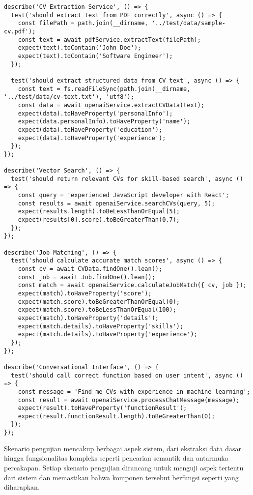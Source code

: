 \begin{verbatim}
describe('CV Extraction Service', () => {
  test('should extract text from PDF correctly', async () => {
    const filePath = path.join(__dirname, '../test/data/sample-cv.pdf');
    const text = await pdfService.extractText(filePath);
    expect(text).toContain('John Doe');
    expect(text).toContain('Software Engineer');
  });

  test('should extract structured data from CV text', async () => {
    const text = fs.readFileSync(path.join(__dirname, '../test/data/cv-text.txt'), 'utf8');
    const data = await openaiService.extractCVData(text);
    expect(data).toHaveProperty('personalInfo');
    expect(data.personalInfo).toHaveProperty('name');
    expect(data).toHaveProperty('education');
    expect(data).toHaveProperty('experience');
  });
});

describe('Vector Search', () => {
  test('should return relevant CVs for skill-based search', async () => {
    const query = 'experienced JavaScript developer with React';
    const results = await openaiService.searchCVs(query, 5);
    expect(results.length).toBeLessThanOrEqual(5);
    expect(results[0].score).toBeGreaterThan(0.7);
  });
});

describe('Job Matching', () => {
  test('should calculate accurate match scores', async () => {
    const cv = await CVData.findOne().lean();
    const job = await Job.findOne().lean();
    const match = await openaiService.calculateJobMatch({ cv, job });
    expect(match).toHaveProperty('score');
    expect(match.score).toBeGreaterThanOrEqual(0);
    expect(match.score).toBeLessThanOrEqual(100);
    expect(match).toHaveProperty('details');
    expect(match.details).toHaveProperty('skills');
    expect(match.details).toHaveProperty('experience');
  });
});

describe('Conversational Interface', () => {
  test('should call correct function based on user intent', async () => {
    const message = 'Find me CVs with experience in machine learning';
    const result = await openaiService.processChatMessage(message);
    expect(result).toHaveProperty('functionResult');
    expect(result.functionResult.length).toBeGreaterThan(0);
  });
});
\end{verbatim}

Skenario pengujian mencakup berbagai aspek sistem, dari ekstraksi data dasar hingga fungsionalitas kompleks seperti pencarian semantik dan antarmuka percakapan. Setiap skenario pengujian dirancang untuk menguji aspek tertentu dari sistem dan memastikan bahwa komponen tersebut berfungsi seperti yang diharapkan.

